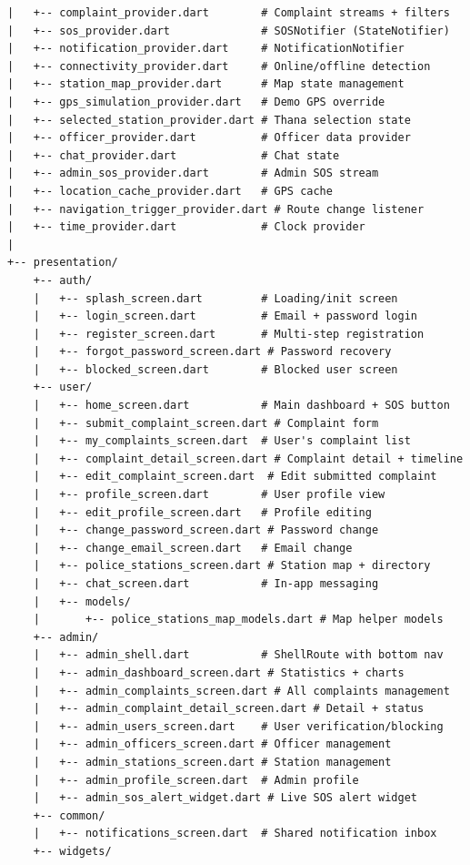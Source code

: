 \documentclass[11pt, a4paper]{report}
\begin{document}
\begin{verbatim}
|   +-- complaint_provider.dart        # Complaint streams + filters
|   +-- sos_provider.dart              # SOSNotifier (StateNotifier)
|   +-- notification_provider.dart     # NotificationNotifier
|   +-- connectivity_provider.dart     # Online/offline detection
|   +-- station_map_provider.dart      # Map state management
|   +-- gps_simulation_provider.dart   # Demo GPS override
|   +-- selected_station_provider.dart # Thana selection state
|   +-- officer_provider.dart          # Officer data provider
|   +-- chat_provider.dart             # Chat state
|   +-- admin_sos_provider.dart        # Admin SOS stream
|   +-- location_cache_provider.dart   # GPS cache
|   +-- navigation_trigger_provider.dart # Route change listener
|   +-- time_provider.dart             # Clock provider
|
+-- presentation/
    +-- auth/
    |   +-- splash_screen.dart         # Loading/init screen
    |   +-- login_screen.dart          # Email + password login
    |   +-- register_screen.dart       # Multi-step registration
    |   +-- forgot_password_screen.dart # Password recovery
    |   +-- blocked_screen.dart        # Blocked user screen
    +-- user/
    |   +-- home_screen.dart           # Main dashboard + SOS button
    |   +-- submit_complaint_screen.dart # Complaint form
    |   +-- my_complaints_screen.dart  # User's complaint list
    |   +-- complaint_detail_screen.dart # Complaint detail + timeline
    |   +-- edit_complaint_screen.dart  # Edit submitted complaint
    |   +-- profile_screen.dart        # User profile view
    |   +-- edit_profile_screen.dart   # Profile editing
    |   +-- change_password_screen.dart # Password change
    |   +-- change_email_screen.dart   # Email change
    |   +-- police_stations_screen.dart # Station map + directory
    |   +-- chat_screen.dart           # In-app messaging
    |   +-- models/
    |       +-- police_stations_map_models.dart # Map helper models
    +-- admin/
    |   +-- admin_shell.dart           # ShellRoute with bottom nav
    |   +-- admin_dashboard_screen.dart # Statistics + charts
    |   +-- admin_complaints_screen.dart # All complaints management
    |   +-- admin_complaint_detail_screen.dart # Detail + status
    |   +-- admin_users_screen.dart    # User verification/blocking
    |   +-- admin_officers_screen.dart # Officer management
    |   +-- admin_stations_screen.dart # Station management
    |   +-- admin_profile_screen.dart  # Admin profile
    |   +-- admin_sos_alert_widget.dart # Live SOS alert widget
    +-- common/
    |   +-- notifications_screen.dart  # Shared notification inbox
    +-- widgets/

\end{verbatim}
\end{document}
